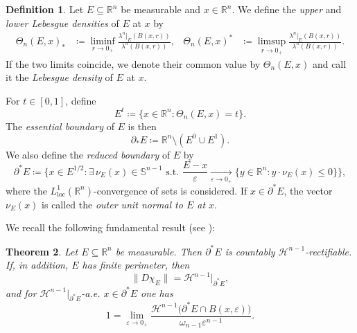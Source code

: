\documentclass[pdflatex,sn-mathphys-num]{sn-jnl}
\theoremstyle{plain}
\newtheorem{theorem}{Theorem}[section]
\theoremstyle{definition}
\newtheorem{definition}[theorem]{Definition}
\begin{document}
\begin{definition}\label{outer}
Let $E \subseteq \mathbb{R}^n$ be measurable and $x \in \mathbb{R}^n$.  
We define the \textit{upper} and \textit{lower Lebesgue densities} of $E$ at $x$ by
\begin{align*}
\Theta_n(E, x)_* &\coloneq \liminf_{r \to 0_+} \frac{\lambda^n|_E(B(x, r))}{\lambda^n(B(x, r))}, 
&
\Theta_n(E, x)^* &\coloneq \limsup_{r \to 0_+} \frac{\lambda^n|_E(B(x, r))}{\lambda^n(B(x, r))}.
\end{align*}
If the two limits coincide, we denote their common value by $\Theta_n(E, x)$ and call it the \textit{Lebesgue density} of $E$ at $x$.

\smallskip
For $t \in [0,1]$, define
\[
E^t \coloneq \{x \in \mathbb{R}^n : \Theta_n(E, x) = t\}.
\]
The \textit{essential boundary} of $E$ is then
\[
\partial_* E \coloneq \mathbb{R}^n \setminus (E^0 \cup E^1).
\]
We also define the \textit{reduced boundary} of $E$ by
\[
\partial^* E \coloneq 
\Big\{x \in E^{1/2} : 
\exists\, \nu_E(x) \in \mathbb{S}^{n-1} \text{ s.t. }
\frac{E - x}{\varepsilon} \xrightarrow[\varepsilon \to 0_+]{} 
\{y \in \mathbb{R}^n : y \cdot \nu_E(x) \le 0\}
\Big\},
\] where the $L^1_{\mathrm{loc}}(\mathbb{R}^n)$-convergence of sets is considered.
If $x \in \partial^* E$, the vector $\nu_E(x)$ is called the \textit{outer unit normal to $E$ at $x$}.
\end{definition}

We recall the following fundamental result (see \cite[Theorem 3.59]{ambrosio}):

\begin{theorem}\label{theorem}
Let $E \subseteq \mathbb{R}^n$ be measurable.  
Then $\partial^* E$ is countably $\mathcal{H}^{n-1}$-rectifiable. If, in addition, $E$ has finite perimeter, then $$\|D\chi_E\| = \mathcal{H}^{n-1}\!\big|_{\partial^* E},$$ and for $\mathcal{H}^{n-1}\!\big|_{\partial^* E}$-a.e. $x \in \partial^* E$ one has
\[
1 = \lim_{\varepsilon \to 0_+} 
\frac{\mathcal{H}^{n-1}\big(\partial^* E \cap B(x, \varepsilon)\big)}{\omega_{n-1} \varepsilon^{n-1}}.
\]
\end{theorem}
\end{document}
